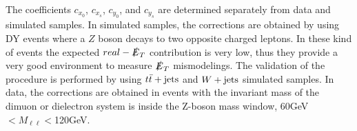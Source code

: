 The coefficients $c_{x_0}$, $c_{x_s}$, $c_{y_0}$, and $c_{y_s}$ are determined
separately from data and simulated samples. In simulated samples, the corrections are obtained by using DY events where a $Z$ boson decays to two opposite charged leptons. In these kind of events the expected $real-\slashed{E}_T$ contribution is very low, thus they provide a very good environment to measure $\slashed{E}_T$ mismodelings. The validation of the procedure is performed by using $t\bar{t}+\textrm{jets}$ and $W+\textrm{jets}$ simulated samples. In data, the corrections are obtained in events with the invariant mass of the dimuon or dielectron system is inside the Z-boson mass window, 60GeV$<M_{\ell\ell}<$120GeV.
